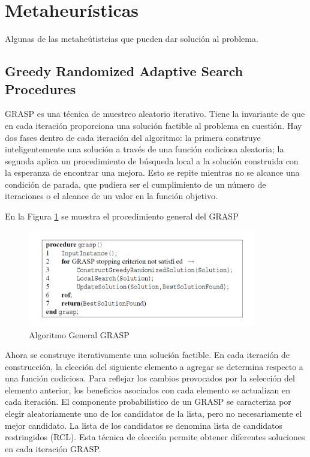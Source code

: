 \documentclass[a4paper,12pt]{book}
\begin{document}
	\section{Metaheurísticas}
	Algunas de las metaheútistcias que pueden dar solución al problema.
		\subsection{Greedy Randomized Adaptive Search Procedures } 
		GRASP \cite{GRASP} es una técnica de muestreo aleatorio iterativo. Tiene la invariante de que en cada iteración proporciona una solución factible al problema en cuestión. Hay dos fases dentro de cada iteración del algoritmo: la primera construye inteligentemente una solución a través de una función codiciosa aleatoria; la segunda aplica un procedimiento de búsqueda local a la solución construida con la esperanza de encontrar una mejora. Esto se repite mientras no se alcance una condición de parada, que pudiera ser el cumplimiento de un número de iteraciones o el alcance de un valor en la función objetivo.
		
		En la Figura \ref{GRASPgeneral} se muestra el procedimiento general del GRASP
		
		\begin{figure}[h]
			\centering
			\includegraphics[width=10cm]{./Graphics/GRASPgeneral.png}
			\caption{Algoritmo General GRASP}
			\label{GRASPgeneral}
		\end{figure}
		
		Ahora se construye iterativamente una solución factible. En cada iteración de construcción, la elección del siguiente elemento a agregar se determina respecto a una función codiciosa. Para reflejar los cambios provocados por la selección del elemento anterior, los beneficios asociados con cada elemento se actualizan en cada iteración. El componente probabilístico de un GRASP se caracteriza por elegir aleatoriamente uno de los candidatos de la lista, pero no necesariamente el mejor candidato. La lista de los candidatos se denomina lista de candidatos restringidos (RCL). Esta técnica de elección permite obtener diferentes soluciones en cada iteración GRASP.
		
\end{document}
